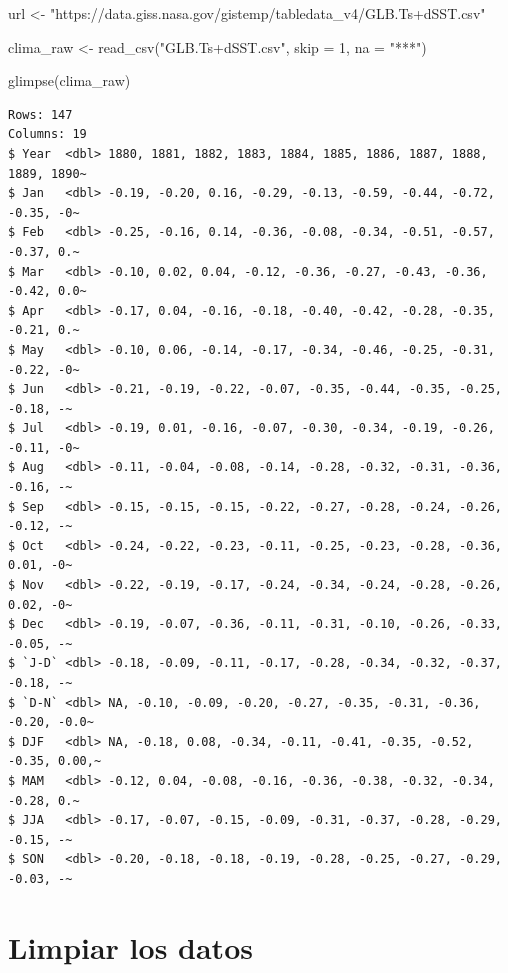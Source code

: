 \documentclass[
  letterpaper,
  DIV=11,
  numbers=noendperiod]{scrreprt}
\newenvironment{Shaded}{\begin{snugshade}}{\end{snugshade}}
\newcommand{\AttributeTok}[1]{\textcolor[rgb]{0.40,0.45,0.13}{#1}}
\newcommand{\DecValTok}[1]{\textcolor[rgb]{0.68,0.00,0.00}{#1}}
\newcommand{\FunctionTok}[1]{\textcolor[rgb]{0.28,0.35,0.67}{#1}}
\newcommand{\NormalTok}[1]{\textcolor[rgb]{0.00,0.23,0.31}{#1}}
\newcommand{\OtherTok}[1]{\textcolor[rgb]{0.00,0.23,0.31}{#1}}
\newcommand{\StringTok}[1]{\textcolor[rgb]{0.13,0.47,0.30}{#1}}
\begin{document}
\begin{Shaded}
\begin{Highlighting}[]
\NormalTok{url }\OtherTok{\textless{}{-}} \StringTok{"https://data.giss.nasa.gov/gistemp/tabledata\_v4/GLB.Ts+dSST.csv"}

\NormalTok{clima\_raw }\OtherTok{\textless{}{-}} \FunctionTok{read\_csv}\NormalTok{(}\StringTok{"GLB.Ts+dSST.csv"}\NormalTok{, }\AttributeTok{skip =} \DecValTok{1}\NormalTok{, }\AttributeTok{na =} \StringTok{"***"}\NormalTok{)}

\FunctionTok{glimpse}\NormalTok{(clima\_raw)}
\end{Highlighting}
\end{Shaded}

\begin{verbatim}
Rows: 147
Columns: 19
$ Year  <dbl> 1880, 1881, 1882, 1883, 1884, 1885, 1886, 1887, 1888, 1889, 1890~
$ Jan   <dbl> -0.19, -0.20, 0.16, -0.29, -0.13, -0.59, -0.44, -0.72, -0.35, -0~
$ Feb   <dbl> -0.25, -0.16, 0.14, -0.36, -0.08, -0.34, -0.51, -0.57, -0.37, 0.~
$ Mar   <dbl> -0.10, 0.02, 0.04, -0.12, -0.36, -0.27, -0.43, -0.36, -0.42, 0.0~
$ Apr   <dbl> -0.17, 0.04, -0.16, -0.18, -0.40, -0.42, -0.28, -0.35, -0.21, 0.~
$ May   <dbl> -0.10, 0.06, -0.14, -0.17, -0.34, -0.46, -0.25, -0.31, -0.22, -0~
$ Jun   <dbl> -0.21, -0.19, -0.22, -0.07, -0.35, -0.44, -0.35, -0.25, -0.18, -~
$ Jul   <dbl> -0.19, 0.01, -0.16, -0.07, -0.30, -0.34, -0.19, -0.26, -0.11, -0~
$ Aug   <dbl> -0.11, -0.04, -0.08, -0.14, -0.28, -0.32, -0.31, -0.36, -0.16, -~
$ Sep   <dbl> -0.15, -0.15, -0.15, -0.22, -0.27, -0.28, -0.24, -0.26, -0.12, -~
$ Oct   <dbl> -0.24, -0.22, -0.23, -0.11, -0.25, -0.23, -0.28, -0.36, 0.01, -0~
$ Nov   <dbl> -0.22, -0.19, -0.17, -0.24, -0.34, -0.24, -0.28, -0.26, 0.02, -0~
$ Dec   <dbl> -0.19, -0.07, -0.36, -0.11, -0.31, -0.10, -0.26, -0.33, -0.05, -~
$ `J-D` <dbl> -0.18, -0.09, -0.11, -0.17, -0.28, -0.34, -0.32, -0.37, -0.18, -~
$ `D-N` <dbl> NA, -0.10, -0.09, -0.20, -0.27, -0.35, -0.31, -0.36, -0.20, -0.0~
$ DJF   <dbl> NA, -0.18, 0.08, -0.34, -0.11, -0.41, -0.35, -0.52, -0.35, 0.00,~
$ MAM   <dbl> -0.12, 0.04, -0.08, -0.16, -0.36, -0.38, -0.32, -0.34, -0.28, 0.~
$ JJA   <dbl> -0.17, -0.07, -0.15, -0.09, -0.31, -0.37, -0.28, -0.29, -0.15, -~
$ SON   <dbl> -0.20, -0.18, -0.18, -0.19, -0.28, -0.25, -0.27, -0.29, -0.03, -~
\end{verbatim}

\section{Limpiar los datos}\label{limpiar-los-datos}
\end{document}
